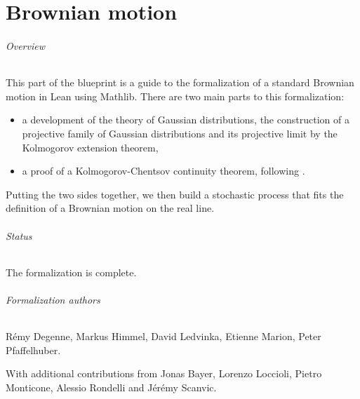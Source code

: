 %

\part{Brownian motion}

\paragraph{Overview}

This part of the blueprint is a guide to the formalization of a standard Brownian motion in Lean using Mathlib. There are two main parts to this formalization:
\begin{itemize}
  \item a development of the theory of Gaussian distributions, the construction of a projective family of Gaussian distributions and its projective limit by the Kolmogorov extension theorem,
  \item a proof of a Kolmogorov-Chentsov continuity theorem, following \cite{kratschmer2023kolmogorov}.
\end{itemize}

Putting the two sides together, we then build a stochastic process that fits the definition of a Brownian motion on the real line.

\paragraph{Status} The formalization is complete.

\paragraph{Formalization authors} Rémy Degenne, Markus Himmel, David Ledvinka, Etienne Marion, Peter Pfaffelhuber.

With additional contributions from Jonas Bayer, Lorenzo Loccioli, Pietro Monticone, Alessio Rondelli and Jérémy Scanvic.

